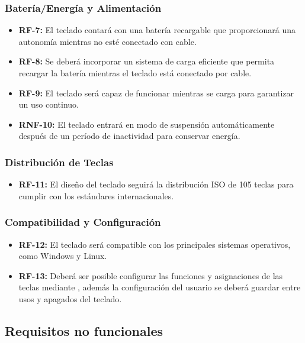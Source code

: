 \subsubsection{Batería/Energía y Alimentación}
\begin{itemize}
\item \textbf{RF-7:} El teclado contará con una batería recargable que proporcionará una autonomía mientras no esté conectado con cable.
\item \textbf{RF-8:} Se deberá incorporar un sistema de carga eficiente que permita recargar la batería mientras el teclado está conectado por cable.
\item \textbf{RF-9:} El teclado será capaz de funcionar mientras se carga para garantizar un uso continuo.
\item \textbf{RNF-10:} El teclado entrará en modo de suspensión automáticamente después de un período de inactividad para conservar energía.
\end{itemize}

\subsubsection{Distribución de Teclas}
\begin{itemize}
\item \textbf{RF-11:} El diseño del teclado seguirá la distribución \gls{ISO} de 105 teclas para cumplir con los estándares internacionales.
\end{itemize}

\subsubsection{Compatibilidad y Configuración}
\begin{itemize}
\item \textbf{RF-12:} El teclado será compatible con los principales sistemas operativos, como \gls{Windows} y \gls{Linux}.
\item \textbf{RF-13:} Deberá ser posible configurar las funciones y asignaciones de las teclas mediante , además la configuración del usuario se deberá guardar entre usos y apagados del teclado.
\end{itemize}

\subsection{Requisitos no funcionales} \label{RequisitosNoFuncionales}

